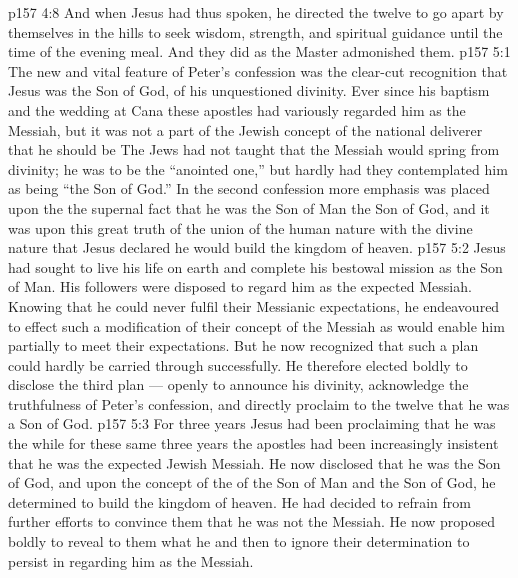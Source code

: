 \vs p157 4:8 \pc And when Jesus had thus spoken, he directed the twelve to go apart by themselves in the hills to seek wisdom, strength, and spiritual guidance until the time of the evening meal. And they did as the Master admonished them.
\vs p157 5:1 The new and vital feature of Peter’s confession was the clear\hyp{}cut recognition that Jesus was the Son of God, of his unquestioned divinity. Ever since his baptism and the wedding at Cana these apostles had variously regarded him as the Messiah, but it was not a part of the Jewish concept of the national deliverer that he should be  The Jews had not taught that the Messiah would spring from divinity; he was to be the “anointed one,” but hardly had they contemplated him as being “the Son of God.” In the second confession more emphasis was placed upon the  the supernal fact that he was the Son of Man  the Son of God, and it was upon this great truth of the union of the human nature with the divine nature that Jesus declared he would build the kingdom of heaven.
\vs p157 5:2 Jesus had sought to live his life on earth and complete his bestowal mission as the Son of Man. His followers were disposed to regard him as the expected Messiah. Knowing that he could never fulfil their Messianic expectations, he endeavoured to effect such a modification of their concept of the Messiah as would enable him partially to meet their expectations. But he now recognized that such a plan could hardly be carried through successfully. He therefore elected boldly to disclose the third plan --- openly to announce his divinity, acknowledge the truthfulness of Peter’s confession, and directly proclaim to the twelve that he was a Son of God.
\vs p157 5:3 For three years Jesus had been proclaiming that he was the  while for these same three years the apostles had been increasingly insistent that he was the expected Jewish Messiah. He now disclosed that he was the Son of God, and upon the concept of the  of the Son of Man and the Son of God, he determined to build the kingdom of heaven. He had decided to refrain from further efforts to convince them that he was not the Messiah. He now proposed boldly to reveal to them what he  and then to ignore their determination to persist in regarding him as the Messiah.
